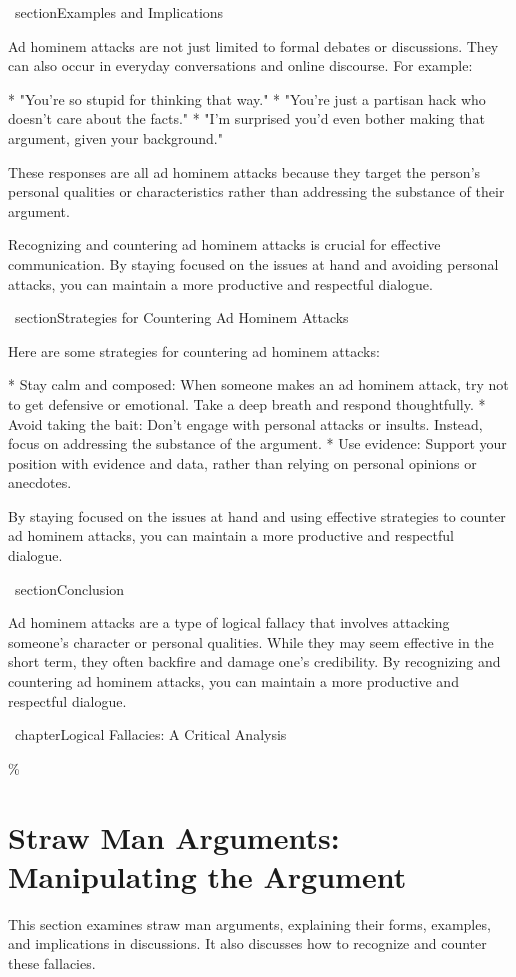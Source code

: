 \documentclass{report}%
\begin{document}
{{{{{{{{{{{{{{\ section{Examples and Implications}

 Ad hominem attacks are not just limited to formal debates or discussions. They can also occur in everyday conversations and online discourse. For example:

*   "You're so stupid for thinking that way."
*   "You're just a partisan hack who doesn't care about the facts."
*   "I'm surprised you'd even bother making that argument, given your background."

 These responses are all ad hominem attacks because they target the person's personal qualities or characteristics rather than addressing the substance of their argument.

 Recognizing and countering ad hominem attacks is crucial for effective communication. By staying focused on the issues at hand and avoiding personal attacks, you can maintain a more productive and respectful dialogue.

\ section{Strategies for Countering Ad Hominem Attacks}

 Here are some strategies for countering ad hominem attacks:

*   Stay calm and composed: When someone makes an ad hominem attack, try not to get defensive or emotional. Take a deep breath and respond thoughtfully.
*   Avoid taking the bait: Don't engage with personal attacks or insults. Instead, focus on addressing the substance of the argument.
*   Use evidence: Support your position with evidence and data, rather than relying on personal opinions or anecdotes.

 By staying focused on the issues at hand and using effective strategies to counter ad hominem attacks, you can maintain a more productive and respectful dialogue.

\ section{Conclusion}

 Ad hominem attacks are a type of logical fallacy that involves attacking someone's character or personal qualities. While they may seem effective in the short term, they often backfire and damage one's credibility. By recognizing and countering ad hominem attacks, you can maintain a more productive and respectful dialogue.

\ chapter{Logical Fallacies: A Critical Analysis}

\%
\section{Straw Man Arguments: Manipulating the Argument}%
This section examines straw man arguments, explaining their forms, examples, and implications in discussions. It also discusses how to recognize and counter these fallacies.

}}}}}}}}}}}}}}
\end{document}
